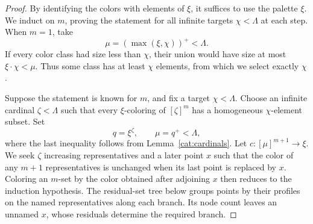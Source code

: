 \begin{proof}
By identifying the colors with elements of $\xi$, it suffices to use
the palette $\xi$. We induct on $m$, proving the statement for all
infinite targets $\chi<\Lambda$ at each step. When $m=1$, take
\[
 \mu=(\max(\xi,\chi))^+<\Lambda.
\]
If every color class had size less than $\chi$, their union would have
size at most $\xi\cdot\chi<\mu$. Thus some class has at least
$\chi$ elements, from which we select exactly $\chi$.

Suppose the statement is known for $m$, and fix a target
$\chi<\Lambda$. Choose an infinite cardinal $\zeta<\Lambda$ such
that every $\xi$-coloring of $[\zeta]^m$ has a homogeneous
$\chi$-element subset. Set
\[
 q=\xi^\zeta,\qquad \mu=q^+<\Lambda,
\]
where the last inequality follows from Lemma~\ref{cat:cardinals}.
Let $c:[\mu]^{m+1}\to\xi$. We seek $\zeta$ increasing representatives and a later point $x$ such
that the color of any $m+1$ representatives is unchanged when its last
point is replaced by $x$. Coloring an $m$-set by the color obtained
after adjoining $x$ then reduces to the induction hypothesis.
The residual-set tree below groups points by their profiles on the
named representatives along each branch. Its node count leaves an
unnamed $x$, whose residuals determine the required branch.


\end{proof}
